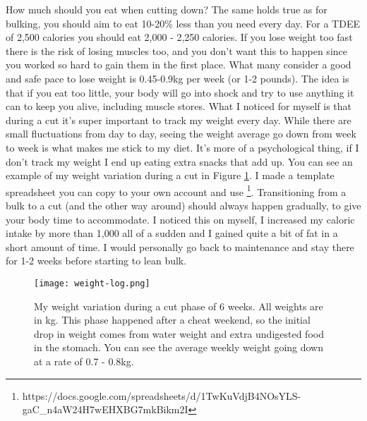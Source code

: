 \documentclass[openany, 12pt]{book}
\begin{document}
	How much should you eat when cutting down? The same holds true as for bulking, you should aim to eat 10-20\% less than you need every day. For a TDEE of 2,500 calories you should eat
        2,000 - 2,250 calories. If you lose weight too fast there is the risk of losing muscles too, and you don't want this to happen since you worked so hard to gain them in the first place. 
	What many consider a good and safe pace to lose weight is 0.45-0.9kg per week (or 1-2 pounds). The idea is that if you eat too little, your body will go into shock and
        try to use anything it can to keep you alive, including muscle stores. What I noticed for myself is that during a cut it's super important to track my weight every day. While there are small
        fluctuations from day to day, seeing the weight average go down from week to week is what makes me stick to my diet. It's more of a psychological thing, if I don't track my weight I end
        up eating extra snacks that add up. You can see an example of my weight variation during a cut in Figure \ref{fig2}. I made a template spreadsheet you can copy to your own account and use
        \footnote{https://docs.google.com/spreadsheets/d/1TwKuVdjB4NOsYLS-gaC\_n4aW24H7wEHXBG7mkBikm2I}.
        Transitioning from a bulk to a cut (and the other way around) should always happen gradually, to give your body time to accommodate. 
	I noticed this on myself, I increased my caloric intake by more than 1,000 all of a sudden and I gained quite a bit of fat in a short amount of time. I would
	personally go back to maintenance and stay there for 1-2 weeks before starting to lean bulk.
        
	\begin{figure}[h]
		\centering
		\texttt{[image: weight-log.png]}
		\caption{My weight variation during a cut phase of 6 weeks. All weights are in kg. This phase happened after a cheat weekend, so the initial drop in weight comes from water weight and
                  extra undigested food in the stomach. You can see the average weekly weight going down at a rate of 0.7 - 0.8kg.}
		\label{fig2}
	\end{figure}
	
\end{document}
